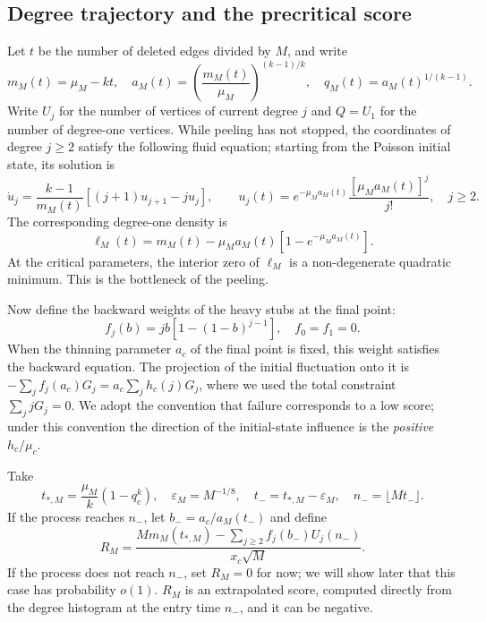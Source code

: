 \subsection{Degree trajectory and the precritical score}\label{sec:mp-traj}
Let $t$ be the number of deleted edges divided by $M$, and write
\begin{equation*}
m_M(t)=\mu_M-kt,\quad a_M(t)=\left(\frac{m_M(t)}{\mu_M}\right)^{(k-1)/k},\quad
q_M(t)=a_M(t)^{1/(k-1)}.
\end{equation*}
Write $U_j$ for the number of vertices of current degree $j$ and $Q=U_1$ for the number of degree-one
vertices. While peeling has not stopped, the coordinates of degree $j\ge2$ satisfy the following fluid
equation; starting from the Poisson initial state, its solution is
\begin{equation*}
\dot u_j=\frac{k-1}{m_M(t)}[(j+1)u_{j+1}-ju_j],\qquad
u_j(t)=e^{-\mu_Ma_M(t)}\frac{[\mu_Ma_M(t)]^j}{j!},\quad j\ge2.
\end{equation*}
The corresponding degree-one density is
\begin{equation*}
\ell_M(t)=m_M(t)-\mu_Ma_M(t)[1-e^{-\mu_Ma_M(t)}].
\end{equation*}
At the critical parameters, the interior zero of $\ell_M$ is a non-degenerate quadratic minimum. This is the
bottleneck of the peeling.

Now define the backward weights of the heavy stubs at the final point:
\begin{equation*}
f_j(b)=jb[1-(1-b)^{j-1}],\quad f_0=f_1=0.
\end{equation*}
When the thinning parameter $a_c$ of the final point is fixed, this weight satisfies the backward equation.
The projection of the initial fluctuation onto it is $-\sum_j f_j(a_c)G_j=a_c\sum_jh_c(j)G_j$, where we used
the total constraint $\sum_jjG_j=0$. We adopt the convention that failure corresponds to a low score; under
this convention the direction of the initial-state influence is the \emph{positive} $h_c/\mu_c$.

Take
\begin{equation*}
t_{*,M}=\frac{\mu_M}{k}(1-q_c^k),\quad
\varepsilon_M=M^{-1/8},\quad t_-=t_{*,M}-\varepsilon_M,\quad
n_-=\lfloor Mt_-\rfloor.
\end{equation*}
If the process reaches $n_-$, let $b_-=a_c/a_M(t_-)$ and define
\begin{equation}
R_M=\frac{M m_M(t_{*,M})-\sum_{j\ge2}f_j(b_-)U_j(n_-)}{x_c\sqrt M}.\label{eq:score}
\end{equation}
If the process does not reach $n_-$, set $R_M=0$ for now; we will show later that this case has probability
$o(1)$. $R_M$ is an extrapolated score, computed directly from the degree histogram at the entry time $n_-$,
and it can be negative.

